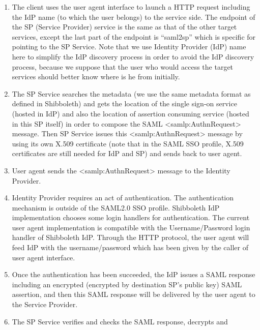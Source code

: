 \documentclass{article}
\newcommand\liststyleLi{%
\renewcommand\theenumi{\arabic{enumi}}
\renewcommand\theenumii{\arabic{enumii}}
\renewcommand\theenumiii{\arabic{enumiii}}
\renewcommand\theenumiv{\arabic{enumiv}}
\renewcommand\labelenumi{\theenumi.}
\renewcommand\labelenumii{\theenumii.}
\renewcommand\labelenumiii{\theenumiii.}
\renewcommand\labelenumiv{\theenumiv.}
}
\begin{document}
\liststyleLi
\begin{enumerate}
\item {\color{black}
The client uses the user agent interface to launch a HTTP request
including the IdP name (to which the user belongs) to the service side.
The endpoint of the SP (Service Provider) service is the same as that
of the other target services, except the last part of the endpoint is
{\textquotedblleft}saml2sp{\textquotedblright} which is specific for
pointing to the SP Service. Note that we use Identity Provider (IdP)
name here to simplify the IdP discovery process in order to avoid the
IdP discovery process, because we suppose that the user who would
access the target services should better know where is he from
initially.}
\item {\color{black}
The SP Service searches the metadata (we use the same metadata format as
defined in Shibboleth) and gets the location of the single sign-on
service (hosted in IdP) and also the location of assertion consuming
service (hosted in this SP itself) in order to compose the SAML
{\textless}samlp:AuthnRequest{\textgreater} message. Then SP Service
issues this {\textless}samlp:AuthnRequest{\textgreater} message by
using its own X.509 certificate (note that in the SAML SSO profile,
X.509 certificates are still needed for IdP and SP) and sends back to
user agent.}
\item {\color{black}
User agent sends the {\textless}samlp:AuthnRequest{\textgreater} message
to the Identity Provider.}
\item {\color{black}
Identity Provider requires an act of authentication. The authentication
mechanism is outside of the SAML2.0 SSO profile. Shibboleth IdP
implementation chooses some login handlers for authentication. The
current user agent implementation is compatible with the
Username/Password login handler of Shibboleth IdP. Through the HTTP
protocol, the user agent will feed IdP with the username/password which
has been given by the caller of user agent interface.}
\item {\color{black}
Once the authentication has been succeeded, the IdP issues a SAML
response including an encrypted (encrypted by destination
SP{\textquoteright}s public key) SAML assertion, and then this SAML
response will be delivered by the user agent to the Service Provider.}
\item {\color{black}
The SP Service verifies and checks the SAML response, decrypts and
}
\end{enumerate}
\end{document}
